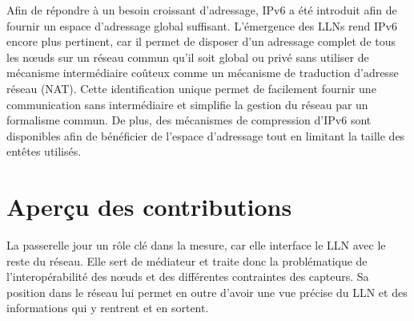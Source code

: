 Afin de répondre à un besoin croissant d'adressage, IPv6 a été introduit afin de fournir un espace d'adressage global suffisant.
L'émergence des \ac{LLN}s rend IPv6 encore plus pertinent, car il permet de disposer d'un adressage complet de tous les nœuds sur un réseau commun qu'il soit global ou privé sans utiliser de mécanisme intermédiaire coûteux comme un mécanisme de traduction d'adresse réseau (\ac{NAT}).
Cette identification unique permet de facilement fournir une communication sans intermédiaire et simplifie la gestion du réseau par un formalisme commun.
De plus, des mécanismes de compression d'IPv6 sont disponibles afin de bénéficier de l'espace d'adressage tout en limitant la taille des entêtes utilisés.





\section{Aperçu des contributions}
\label{intro:contributions}

La passerelle jour un rôle clé dans la mesure, car elle interface le \ac{LLN} avec le reste du réseau.
Elle sert de médiateur et traite donc la problématique de l'interopérabilité des nœuds et des différentes contraintes des capteurs.
Sa position dans le réseau lui permet en outre d'avoir une vue précise du \ac{LLN} et des informations qui y rentrent et en sortent.

